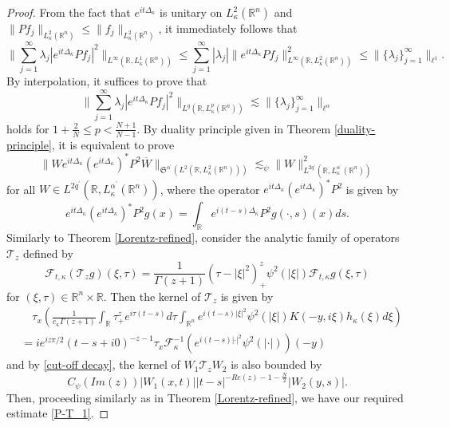 \documentclass[a4paper,11pt, reqno]{amsart}
\numberwithin{equation}{section}
\theoremstyle{plain}
\theoremstyle{definition}
\theoremstyle{remark}
\begin{document}
\begin{proof}
    From the fact that $e^{it\Delta_\kappa}$ is unitary on $L_\kappa^2(\mathbb{R}^n)$ and $\|Pf_j\|_{L_\kappa^2(\mathbb{R}^n)}\leq \|f_j\|_{L_\kappa^2(\mathbb{R}^n)}$, it immediately follows that
    \begin{equation*}
			\bigg\|\sum_{j=1}^\infty \lambda_j|e^{it\Delta_\kappa}Pf_j|^2\bigg\|_{L^\infty(\mathbb{R}, L_\kappa^1(\mathbb{R}^n))}\leq \sum_{j=1}^\infty |\lambda_j|\|e^{it\Delta_\kappa}Pf_j\|^2_{L^\infty(\mathbb{R}, L_\kappa^2(\mathbb{R}^n))}\leq \|\{\lambda_j\}^\infty_{j=1}\|_{\ell^1}. 
\end{equation*}	
By interpolation, it suffices to prove that 
\begin{equation*}
			\bigg\|\sum_{j=1}^\infty \lambda_j|e^{it\Delta_\kappa}Pf_j|^2\bigg\|_{L^q(\mathbb{R}, L_\kappa^p(\mathbb{R}^n))}\lesssim \|\{\lambda_j\}^\infty_{j=1}\|_{\ell^{\alpha}} 
\end{equation*}	
holds for $1+\frac{2}{N}\leq p<\frac{N+1}{N-1}$. By duality principle  given in Theorem \ref{duality-principle}, it is equivalent to  prove
\begin{equation}\label{P-T_1}
	\big\|We^{it\Delta_\kappa}(e^{it\Delta_\kappa})^*P^2\overline{W}\big\|_{\mathfrak{S}^{\alpha^\prime}(L^2(\mathbb{R}, L_\kappa^2(\mathbb{R}^n)))}\lesssim_\psi\big\|W\big\|^2_{L^{2q^\prime}(\mathbb{R}, L_\kappa^{\alpha^\prime}(\mathbb{R}^n))}
		\end{equation}
  for all $W\in L^{2q^\prime}(\mathbb{R}, L_\kappa^{\alpha^\prime}(\mathbb{R}^n))$, where the operator $e^{it\Delta_\kappa}(e^{it\Delta_\kappa})^*P^2$ is given by
  \begin{equation*}
      e^{it\Delta_\kappa}(e^{it\Delta_\kappa})^*P^2g(x)=\int_\mathbb{R} e^{i(t-s)\Delta_\kappa} P^2g(\cdot,s)(x)ds.
  \end{equation*}
 Similarly to Theorem \ref{Lorentz-refined},  consider the analytic family of operators $\mathcal{T}_z$ defined by
\begin{equation*}
    \mathcal{F}_{t,\kappa}(\mathcal{T}_zg)(\xi,\tau)=\frac{1}{\Gamma(z+1)}(\tau-|\xi|^2)_+^z\psi^2(|\xi|)\mathcal{F}_{t,\kappa}g(\xi,\tau)
\end{equation*}
for $(\xi,\tau)\in\mathbb{R}^n\times\mathbb{R}$. Then the kernel of $\mathcal{T}_z$ is given by
\begin{align*}
    &\quad \tau_x\left(\frac{1}{c_\kappa\Gamma(z+1)}\int_{\mathbb{R}}\tau_+^ze^{i\tau (t-s)}d\tau\int_{\mathbb{R}^n} e^{i(t-s)|\xi|^2} \psi^2(|\xi|)K(-y,i \xi)h_\kappa(\xi)d\xi\right)\\
    &=ie^{iz \pi/2}(t-s+i0)^{-z-1}\tau_x\mathcal{F}^{-1}_\kappa \left(e^{i(t-s)|\cdot|^2} \psi^2(|\cdot|)\right)(-y)
\end{align*}
and by \eqref{cut-off decay}, the kernel of $W_1\mathcal{T}_z W_2$ is also bounded by
$$C_\psi(Im(z))|W_1(x,t)||t-s|^{-Re(z)-1-\frac{N}{2}}|W_2(y,s)|.$$
Then, proceeding similarly as in  Theorem \ref{Lorentz-refined}, we have our required estimate \eqref{P-T_1}. 
\end{proof}
\end{document}
